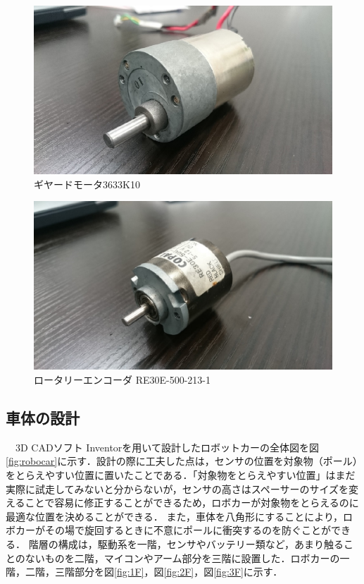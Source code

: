 \begin{figure}[H]
 \begin{center}
  \includegraphics[scale=.7]{../kuwano/picture/picture2.eps}
  \caption{ギヤードモータ3633K10}
 \end{center}
\end{figure}

\begin{figure}[H]
 \begin{center}
  \includegraphics[scale=.7]{../kuwano/picture/picture3.eps}
  \caption{ロータリーエンコーダ RE30E-500-213-1}
 \end{center}
\end{figure}



\subsection{車体の設計}
　3D CADソフト Inventorを用いて設計したロボットカーの全体図を図\ref{fig:robocar}に示す．設計の際に工夫した点は，センサの位置を対象物（ポール）をとらえやすい位置に置いたことである．「対象物をとらえやすい位置」はまだ実際に試走してみないと分からないが，センサの高さはスペーサーのサイズを変えることで容易に修正することができるため，ロボカーが対象物をとらえるのに最適な位置を決めることができる．
また，車体を八角形にすることにより，ロボカーがその場で旋回するときに不意にポールに衝突するのを防ぐことができる．
階層の構成は，駆動系を一階，センサやバッテリー類など，あまり触ることのないものを二階，マイコンやアーム部分を三階に設置した．ロボカーの一階，二階，三階部分を図\ref{fig:1F}，図\ref{fig:2F}，図\ref{fig:3F}に示す．

